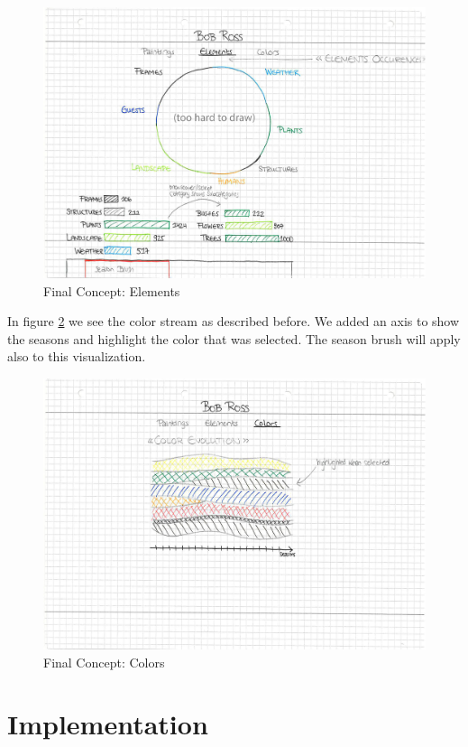 \documentclass[a4paper]{tufte-book}
\begin{document}
\begin{figure}
	\includegraphics{Images/final_concept_draft_2.jpg}
	\caption{Final Concept: Elements}
	\label{fig:final2}
\end{figure}

In figure \ref{fig:final3} we see the color stream as described before. We added an axis to show the seasons and highlight the color that was selected. The season brush will apply also to this visualization.\\

\begin{figure}
	\includegraphics{Images/final_concept_draft_3.jpg}
	\caption{Final Concept: Colors}
	\label{fig:final3}
\end{figure}

\chapter{Implementation}
\end{document}
